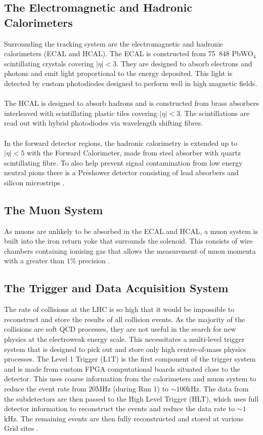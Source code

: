 \subsection{The Electromagnetic and Hadronic Calorimeters} Surrounding
the tracking system are the electromagnetic and hadronic calorimeters
(ECAL and HCAL). The ECAL is constructed from 75~848 PbWO$_4$
scintillating crystals covering $|\eta|<3$. They are designed to
absorb electrons and photons and emit light proportional to the energy
deposited. This light is detected by custom photodiodes designed to
perform well in high magnetic fields.  \\\\ The HCAL is designed to
absorb hadrons and is constructed from brass absorbers interleaved
with scintillating plastic tiles covering $|\eta|<3$. The
scintillations are read out with hybrid photodiodes via wavelength
shifting fibres.  \\\\ In the forward detector regions, the hadronic
calorimetry is extended up to $|\eta|<5$ with the Forward Calorimeter,
made from steel absorber with quartz scintillating fibre. To also help
prevent signal contamination from low energy neutral pions there is a
Preshower detector consisting of lead absorbers and silicon
microstrips \cite{CMSTechDesign1DetectorPerformance}\cite{Cutajar}.

\subsection{The Muon System} As muons are unlikely to be absorbed in
the ECAL and HCAL, a muon system is built into the iron return yoke
that surrounds the solenoid.  This consists of wire chambers
containing ionising gas that allows the measurement of muon momenta
with a greater than $1\%$ precision
\cite{CMS_Overview_Chatrchyan:2008aa}.

\subsection{The Trigger and Data Acquisition System}
\label{sec:triggers} The rate of collisions at the LHC is so high that
it would be impossible to reconstruct and store the results of all
collision events. As the majority of the collisions are soft QCD
processes, they are not useful in the search for new physics at the
electroweak energy scale. This necessitates a multi-level trigger
system that is designed to pick out and store only high centre-of-mass
physics processes. The Level 1 Trigger (L1T) is the first component of
the trigger system and is made from custom FPGA computational boards
situated close to the detector. This uses coarse information from the
calorimeters and muon system to reduce the event rate from $20$MHz
(during Run 1) to $\sim100$kHz. The data from the subdetectors are
then passed to the High Level Trigger (HLT), which uses full detector
information to reconstruct the events and reduce the data rate to
$\sim1$kHz. The remaining events are then fully reconstructed and
stored at various Grid sites \cite{GridTechDesign}.


